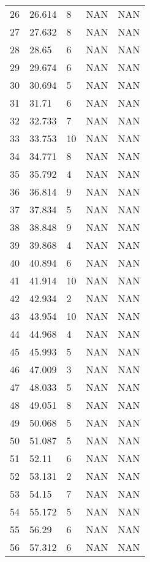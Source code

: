 \documentclass{article}
\begin{document}
\begin{longtable}{@{}lllll@{}}
				26  & 26.614  & 8     & NAN   & NAN   \\
				27  & 27.632  & 8     & NAN   & NAN   \\
				28  & 28.65   & 6     & NAN   & NAN   \\
				29  & 29.674  & 6     & NAN   & NAN   \\
				30  & 30.694  & 5     & NAN   & NAN   \\
				31  & 31.71   & 6     & NAN   & NAN   \\
				32  & 32.733  & 7     & NAN   & NAN   \\
				33  & 33.753  & 10    & NAN   & NAN   \\
				34  & 34.771  & 8     & NAN   & NAN   \\
				35  & 35.792  & 4     & NAN   & NAN   \\
				36  & 36.814  & 9     & NAN   & NAN   \\
				37  & 37.834  & 5     & NAN   & NAN   \\
				38  & 38.848  & 9     & NAN   & NAN   \\
				39  & 39.868  & 4     & NAN   & NAN   \\
				40  & 40.894  & 6     & NAN   & NAN   \\
				41  & 41.914  & 10    & NAN   & NAN   \\
				42  & 42.934  & 2     & NAN   & NAN   \\
				43  & 43.954  & 10    & NAN   & NAN   \\
				44  & 44.968  & 4     & NAN   & NAN   \\
				45  & 45.993  & 5     & NAN   & NAN   \\
				46  & 47.009  & 3     & NAN   & NAN   \\
				47  & 48.033  & 5     & NAN   & NAN   \\
				48  & 49.051  & 8     & NAN   & NAN   \\
				49  & 50.068  & 5     & NAN   & NAN   \\
				50  & 51.087  & 5     & NAN   & NAN   \\
				51  & 52.11   & 6     & NAN   & NAN   \\
				52  & 53.131  & 2     & NAN   & NAN   \\
				53  & 54.15   & 7     & NAN   & NAN   \\
				54  & 55.172  & 5     & NAN   & NAN   \\
				55  & 56.29   & 6     & NAN   & NAN   \\
				56  & 57.312  & 6     & NAN   & NAN   \\

\end{longtable}
\end{document}
